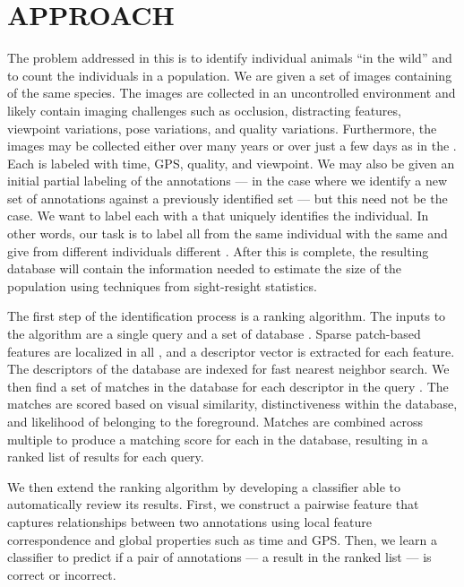 \section{APPROACH}
    The problem addressed in this \thesis{} is to identify individual animals ``in the wild'' and to count the
      individuals in a population.
    We are given a set of images containing \annots{} of the same species.
    The images are collected in an uncontrolled environment and likely contain imaging challenges such as
      occlusion, distracting features, viewpoint variations, pose variations, and quality variations.
    Furthermore, the images may be collected either over many years or over just a few days as in the \GZC{}.
    Each \annot{} is labeled with time, GPS, quality, and viewpoint.
    We may also be given an initial partial \name{} labeling of the annotations --- \eg{} in the case where we
      identify a new set of annotations against a previously identified set --- but this need not be the case.
    We want to label each \annot{} with a \glossterm{\name{}} that uniquely identifies the individual.
    In other words, our task is to label all \annots{} from the same individual with the same \name{} and give
      \annots{} from different individuals different \names{}.
    After this is complete, the resulting database will contain the information needed to estimate the size of
      the population using techniques from sight-resight statistics.

    The first step of the identification process is a ranking algorithm. The inputs to the algorithm are a single query
    \annot{} and a set of database \annots{}. Sparse patch-based features are localized in all \annots{}, and a
    descriptor vector is extracted for each feature. The descriptors of the database \annots{} are indexed for fast
    nearest neighbor search. We then find a set of matches in the database for each descriptor in the query \annot{}.
    The matches are scored based on visual similarity, distinctiveness within the database, and likelihood of belonging
    to the foreground. Matches are combined across multiple \exemplar{} \annots{} to produce a matching score for each
    \name{} in the database, resulting in a ranked list of results for each query.

    We then extend the ranking algorithm by developing a classifier able to automatically review its results.
    First, we construct a pairwise feature that captures relationships between two annotations using local
      feature correspondence and global properties such as time and GPS.
    Then, we learn a classifier to predict if a pair of annotations --- \ie{} a result in the ranked list --- is
      correct or incorrect.

